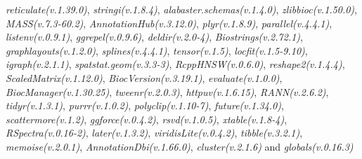 \documentclass[
]{book}
\begin{document}
\emph{reticulate(v.1.39.0)}, \emph{stringi(v.1.8.4)}, \emph{alabaster.schemas(v.1.4.0)}, \emph{zlibbioc(v.1.50.0)}, \emph{MASS(v.7.3-60.2)}, \emph{AnnotationHub(v.3.12.0)}, \emph{plyr(v.1.8.9)}, \emph{parallel(v.4.4.1)}, \emph{listenv(v.0.9.1)}, \emph{ggrepel(v.0.9.6)}, \emph{deldir(v.2.0-4)}, \emph{Biostrings(v.2.72.1)}, \emph{graphlayouts(v.1.2.0)}, \emph{splines(v.4.4.1)}, \emph{tensor(v.1.5)}, \emph{locfit(v.1.5-9.10)}, \emph{igraph(v.2.1.1)}, \emph{spatstat.geom(v.3.3-3)}, \emph{RcppHNSW(v.0.6.0)}, \emph{reshape2(v.1.4.4)}, \emph{ScaledMatrix(v.1.12.0)}, \emph{BiocVersion(v.3.19.1)}, \emph{evaluate(v.1.0.0)}, \emph{BiocManager(v.1.30.25)}, \emph{tweenr(v.2.0.3)}, \emph{httpuv(v.1.6.15)}, \emph{RANN(v.2.6.2)}, \emph{tidyr(v.1.3.1)}, \emph{purrr(v.1.0.2)}, \emph{polyclip(v.1.10-7)}, \emph{future(v.1.34.0)}, \emph{scattermore(v.1.2)}, \emph{ggforce(v.0.4.2)}, \emph{rsvd(v.1.0.5)}, \emph{xtable(v.1.8-4)}, \emph{RSpectra(v.0.16-2)}, \emph{later(v.1.3.2)}, \emph{viridisLite(v.0.4.2)}, \emph{tibble(v.3.2.1)}, \emph{memoise(v.2.0.1)}, \emph{AnnotationDbi(v.1.66.0)}, \emph{cluster(v.2.1.6)} and \emph{globals(v.0.16.3)}

  
\end{document}
